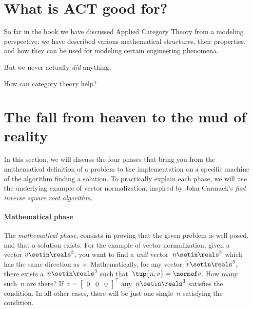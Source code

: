 
\section{What is ACT good for?}

So far in the book we have discussed Applied Category Theory from a modeling perspective: we have described various mathematical structures, their properties, and how they can be used for modeling certain engineering phenomena.

But we never actually \emph{did} anything.

How can category theory help?


\section{The fall from heaven to the mud of reality}
\publictodomessage
In this section, we will discuss the four phases that bring you from the mathematical definition of a problem to the implementation on a specific machine of the algorithm finding a solution.
To practically explain each phase, we will use the underlying example of vector normalization, inspired by John Carmack's \emph{fast inverse square root algorithm}.


\paragraph*{Mathematical phase}
The \emph{mathematical phase}, consists in proving that the given problem is well posed, and that a solution exists.
For the example of vector normalization, given a vector $v\setin \reals^3$, you want to find a \emph{unit} vector~$n\setin \reals^3$ which has the same direction as~$v$.
Mathematically, for any vector~$v\setin \reals^3$, there exists a~$n\setin \reals^3$ such that~$\tup{n,v}=\normof v $.
How many such~$n$ are there?
If~$v=\begin{bmatrix}
        0 & 0 & 0
    \end{bmatrix}^\intercal$ any~$n\setin \reals^3$ satisfies the condition.
In all other cases, there will be just one single~$n$ satisfying the condition.

